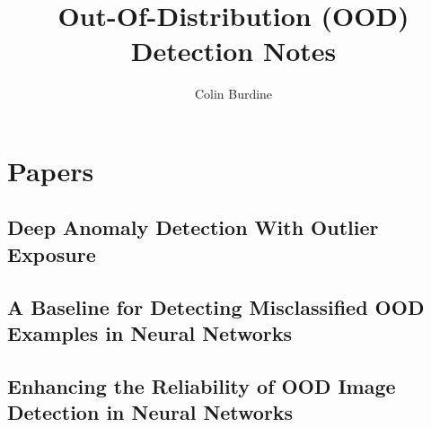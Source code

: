 \documentclass[12pt]{article}
\author{Colin Burdine}
\title{Out-Of-Distribution (OOD) Detection Notes}
\date{}
\begin{document}
\maketitle

\section{Papers}

\subsection{Deep Anomaly Detection With Outlier Exposure \cite{hendrycks_oe}}

\subsection{A Baseline for Detecting Misclassified OOD Examples in Neural Networks \cite{hendrycks_odin}}

\subsection{Enhancing the Reliability of OOD Image Detection in Neural Networks \cite{liang_ood}}



\end{document}
